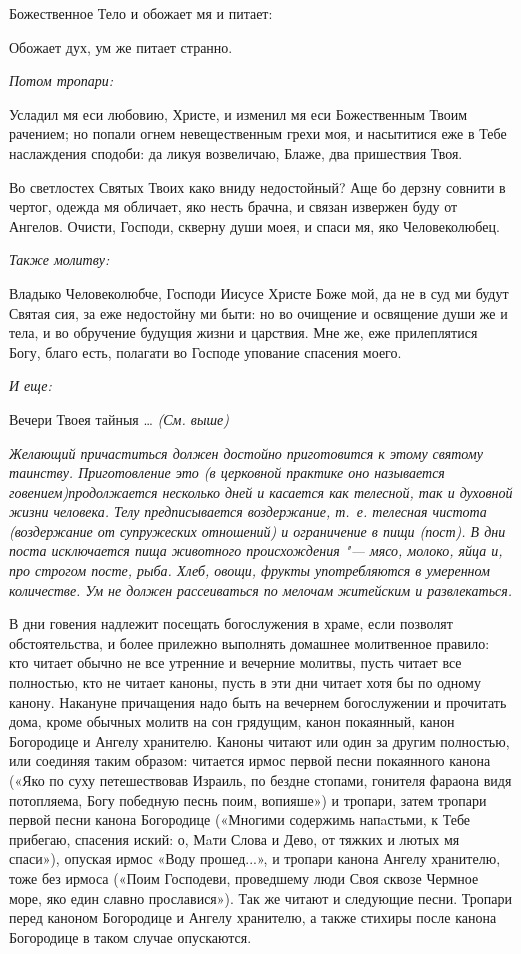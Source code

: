   Божественное Тело и обожает мя и питает:


  Обожает дух, ум же питает странно.


\medskip
\itshape Потом тропари:\normalfont{}


Усладил мя еси любовию, Христе, и изменил мя еси Божественным Твоим рачением; но попали огнем невещественным грехи моя, и насытитися еже в Тебе наслаждения сподоби: да ликуя возвеличаю, Блаже, два пришествия Твоя.


Во светлостех Святых Твоих како вниду недостойный? Аще бо дерзну совнити в чертог, одежда мя обличает, яко несть брачна, и связан извержен буду от Ангелов. Очисти, Господи, скверну души моея, и спаси мя, яко Человеколюбец.


\medskip
\itshape Также молитву:\normalfont{}


Владыко Человеколюбче, Господи Иисусе Христе Боже мой, да не в суд ми будут Святая сия, за еже недостойну ми быти: но во очищение и освящение души же и тела, и во обручение будущия жизни и царствия. Мне же, еже прилеплятися Богу, благо есть, полагати во Господе упование спасения моего.


\medskip
\itshape И еще:\normalfont{}


Вечери Твоея тайныя … \itshape (См. выше)\normalfont{}


\medskip
\itshape Желающий причаститься должен достойно приготовится к этому святому таинству. Приготовление это (в церковной практике оно называется говением)продолжается несколько дней и касается как телесной, так и духовной жизни человека. Телу предписывается воздержание, т.~е. телесная чистота (воздержание от супружеских отношений) и ограничение в пищи (пост). В дни поста исключается пища животного происхождения "--- мясо, молоко, яйца и, про строгом посте, рыба. Хлеб, овощи, фрукты употребляются в умеренном количестве. Ум не должен рассеиваться по мелочам житейским и развлекаться.


В дни говения надлежит посещать богослужения в храме, если позволят обстоятельства, и более прилежно выполнять домашнее молитвенное правило: кто читает обычно не все утренние и вечерние молитвы, пусть читает все полностью, кто не читает каноны, пусть в эти дни читает хотя бы по одному канону. Накануне причащения надо быть на вечернем богослужении и прочитать дома, кроме обычных молитв на сон грядущим, канон покаянный, канон Богородице и Ангелу хранителю. Каноны читают или один за другим полностью, или соединяя таким образом: читается ирмос первой песни покаянного канона («Яко по суху петешествовав Израиль, по бездне стопами, гонителя фараона видя потопляема, Богу победную песнь поим, вопияше») и тропари, затем тропари первой песни канона Богородице («Многими содержимь напaстьми, к Тебе прибегаю, спасения иский: о, Мaти Слова и Дево, от тяжких и лютых мя спаси»), опуская ирмос «Воду прошед...», и тропари канона Ангелу хранителю, тоже без ирмоса («Поим Господеви, проведшему люди Своя сквозе Чермное море, яко един славно прославися»). Так же читают и следующие песни. Тропари перед каноном Богородице и Ангелу хранителю, а также стихиры после канона Богородице в таком случае опускаются.


